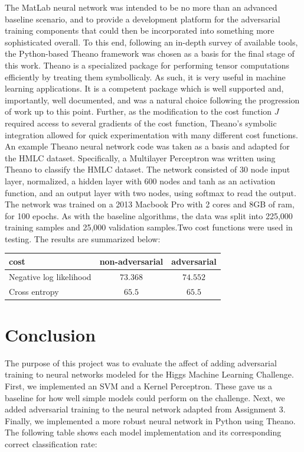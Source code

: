 \documentclass{article} %
\begin{document}
The MatLab neural network was intended to be no more than an advanced baseline scenario, and to provide a development platform for the adversarial training components that could then be incorporated into something more sophisticated overall. To this end, following an in-depth survey of available tools, the Python-based Theano framework was chosen as a basis for the final stage of this work. Theano is a specialized package for performing tensor computations efficiently by treating them symbollicaly. As such, it is very useful in machine learning applications. It is a competent package which is well supported and, importantly, well documented, and was a natural choice following the progression of work up to this point. Further, as the modification to the cost function $J$ required access to several gradients of the cost function, Theano's symbolic integration allowed for quick experimentation with many different cost functions. An example Theano neural network code was taken as a basis and adapted for the HMLC dataset. Specifically, a Multilayer Perceptron was written using Theano to classify the HMLC dataset. The network consisted of 30 node input layer, normalized, a hidden layer with 600 nodes and tanh as an activation function, and an output layer with two nodes, using softmax to read the output. The network was trained on a 2013 Macbook Pro with 2 cores and 8GB of ram, for 100 epochs. As with the baseline algorithms, the data was split into 225,000 training samples and 25,000 validation samples.Two cost functions were used in testing. The results are summarized below:
\begin{center}
	\begin{tabular}{|l|c|c|}
	  \hline
	  cost&non-adversarial&adversarial \\
	  \hline
	  Negative log likelihood&$73.368$&$74.552$\\
	  \hline
	  Cross entropy&$65.5$&$65.5$ \\
	  \hline
	\end{tabular}
\end{center}


\section{Conclusion}
\label{sec:conclusion}

The purpose of this project was to evaluate the affect of adding adversarial training to neural networks modeled for the Higgs Machine Learning Challenge. First, we implemented an SVM and a Kernel Perceptron. These gave us a baseline for how well simple models could perform on the challenge. Next, we added adversarial training to the neural network adapted from Assignment 3. Finally, we implemented a more robust neural network in Python using Theano. The following table shows each model implementation and its corresponding correct classification rate:
\end{document}
